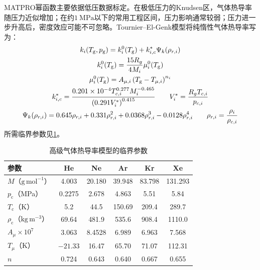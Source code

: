 MATPRO幂函数主要依据低压数据标定。在极低压力的Knudsen区，气体热导率随压力近似增加；在约$1\ \mathrm{MPa}$以下的常用工程区间，压力影响通常较弱；压力进一步升高后，密度效应可能不可忽略\cite{toptanGapConductanceModeling2019,tournierPropertiesNobleGases2008}。Tournier--El-Genk模型将纯惰性气体热导率写为：
\begin{gather}
	k_i(T_{\mathrm g},p_{\mathrm g})
	=k_i^0(T_{\mathrm g})+k_{i,c}^{*}\Psi_k(\rho_{r,i})
	\notag
	\\
	k_i^0(T_{\mathrm g})
	=\frac{15R_g}{4M_i}\mu_i^0(T_{\mathrm g})
	\notag
	\\
	\mu_i^0(T_{\mathrm g})
	=A_{\mu,i}\left(T_{\mathrm g}-T_{\mu,i}\right)^{n_i}
	\notag
	\\
	k_{i,c}^{*}
	=\frac{0.201\times10^{-4}
		T_{c,i}^{0.277}M_i^{-0.465}}
	{\left(0.291V_i^{*}\right)^{0.415}}
	\qquad
	V_i^{*}=\frac{R_gT_{c,i}}{p_{c,i}}
	\notag
	\\
	\Psi_k(\rho_{r,i})
	=0.645\rho_{r,i}
	+0.331\rho_{r,i}^2
	+0.0368\rho_{r,i}^3
	-0.0128\rho_{r,i}^4
	\qquad
	\rho_{r,i}=\frac{\rho_i}{\rho_{c,i}}
	\label{eq:appendix_gap_advanced_conductivity_model}
\end{gather}
所需临界参数见\tablename\ref{tab:appendix_gap_critical_gas_properties}。

\begin{table}[htbp]
	\centering
	\caption{高级气体热导率模型的临界参数\cite{tournierPropertiesNobleGases2008}}
	\label{tab:appendix_gap_critical_gas_properties}
	\begin{tabular*}{\textwidth}{
			@{\extracolsep{\fill}}
			lccccc
			@{}
		}
		\toprule
		参数 & He & Ne & Ar & Kr & Xe \\
		\midrule
		$M$（$\mathrm{g\,mol^{-1}}$） & 4.003 & 20.180 & 39.948 & 83.798 & 131.293 \\
		$p_{\mathrm c}$（MPa） & 0.2275 & 2.678 & 4.863 & 5.51 & 5.84 \\
		$T_{\mathrm c}$（K） & 5.2 & 44.5 & 150.69 & 209.4 & 289.7 \\
		$\rho_{\mathrm c}$（$\mathrm{kg\,m^{-3}}$） & 69.64 & 481.9 & 535.6 & 908.4 & 1110.0 \\
		$A_\mu\times10^7$ & 3.063 & 8.4528 & 6.989 & 6.963 & 7.568 \\
		$T_\mu$（K） & $-21.33$ & 16.47 & 65.70 & 71.07 & 112.31 \\
		$n$ & 0.724 & 0.643 & 0.640 & 0.667 & 0.655 \\
		\bottomrule
	\end{tabular*}
\end{table}

